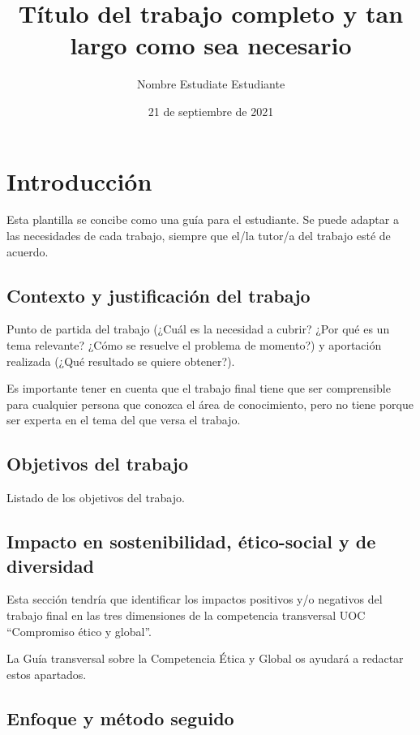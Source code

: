 \documentclass[IB]{TFUOC}%
\title{Título del trabajo completo y tan largo como sea necesario}
\author{Nombre Estudiate Estudiante}
\date{21 de septiembre de 2021}
\begin{document}
\estructura

\tableofcontents

\listoffigures

\listoftables




\chapter{Introducción}

Esta plantilla se concibe como una guía para el estudiante. Se puede adaptar a las necesidades de cada trabajo, siempre que el/la tutor/a del trabajo esté de acuerdo.

\section{Contexto y justificación del trabajo}


Punto de partida del trabajo (¿Cuál es la necesidad a cubrir? ¿Por qué es un tema relevante? ¿Cómo se resuelve el problema de momento?) y aportación realizada (¿Qué resultado se quiere obtener?).

Es importante tener en cuenta que el trabajo final tiene que ser comprensible para cualquier persona que conozca el área de conocimiento, pero no tiene porque ser experta en el tema del que versa el trabajo.

\section{Objetivos del trabajo}

Listado de los objetivos del trabajo.

\section{Impacto en sostenibilidad, ético-social y de diversidad}
\label{s:etic}

Esta sección tendría que identificar los impactos positivos y/o negativos del trabajo final en las tres dimensiones de la competencia transversal UOC “Compromiso ético y global”.
 
La Guía transversal sobre la Competencia Ética y Global os ayudará a redactar estos apartados.


\section{Enfoque y método seguido}
\end{document}
